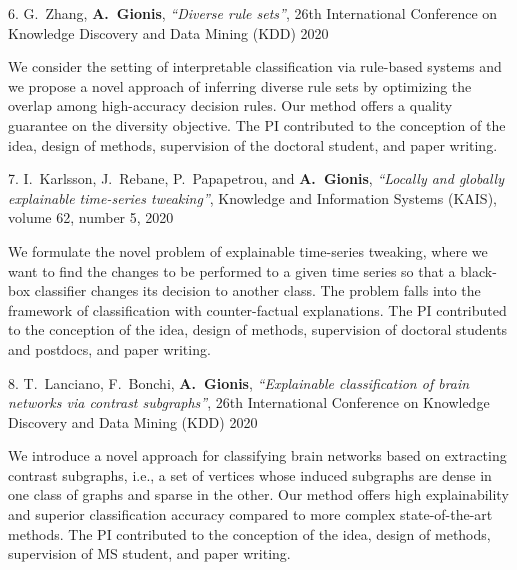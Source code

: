 \documentclass[a4paper,11pt]{article}
\begin{document}
\textbibspace

\item[{6.}]
{G.\ Zhang, \textbf{A.\ Gionis}},
{\em ``Diverse rule sets''},
26th International Conference on Knowledge Discovery and Data Mining (KDD) 2020
%
\item[]
We consider the setting of interpretable classification via rule-based systems and
we propose a novel approach of inferring diverse rule sets by optimizing the overlap among 
high-accuracy decision rules.
Our method offers a quality guarantee on the diversity objective. 
The PI contributed to the conception of the idea, 
design of methods, supervision of the doctoral student, and paper writing.


\textbibspace

\item[{7.}]
{I.\ Karlsson, J.\ Rebane, P.\ Papapetrou, and \textbf{A.\ Gionis}}, 
{\em ``Locally and globally explainable time-series tweaking''}, 
Knowledge and Information Systems (KAIS),
volume 62, number 5, 2020
%
\item[]
We formulate the novel problem of explainable time-series tweaking, 
where we want to find the changes to be performed to a given time series 
so that a black-box classifier changes its decision to another class. 
The problem falls into the framework of classification with counter-factual explanations. 
The PI contributed to the conception of the idea, 
design of methods, supervision of doctoral students and postdocs, and paper writing.

\textbibspace

\item[{8.}]
{T.\ Lanciano, F.\ Bonchi, \textbf{A.\ Gionis}},
{\em ``Explainable classification of brain networks via contrast subgraphs''},
26th International Conference on Knowledge Discovery and Data Mining (KDD) 2020
%
\item[]
We introduce a novel approach for classifying brain networks based on extracting contrast subgraphs, 
i.e., a set of vertices whose induced subgraphs are dense in one class of graphs and sparse in the other.
Our method offers high explainability and superior classification accuracy
compared to more complex state-of-the-art methods.
The PI contributed to the conception of the idea, 
design of methods, supervision of MS student, and paper writing.
\end{document}
